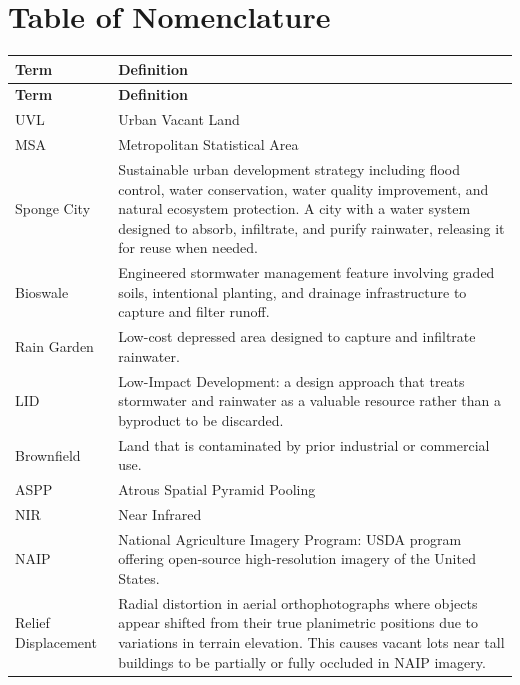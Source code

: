 \clearpage

\chapter*{Table of Nomenclature}

\begin{longtable}{@{} p{3.5cm} p{10cm} @{}}
\toprule
\textbf{Term} & \textbf{Definition} \\
\midrule
\endfirsthead
\toprule
\textbf{Term} & \textbf{Definition} \\
\midrule
\endhead
\bottomrule
\endfoot

UVL & Urban Vacant Land \\
MSA & Metropolitan Statistical Area \\
Sponge City & Sustainable urban development strategy including flood control, water conservation, water quality improvement, and natural ecosystem protection. A city with a water system designed to absorb, infiltrate, and purify rainwater, releasing it for reuse when needed. \\
Bioswale & Engineered stormwater management feature involving graded soils, intentional planting, and drainage infrastructure to capture and filter runoff. \\
Rain Garden & Low-cost depressed area designed to capture and infiltrate rainwater. \\
LID & Low-Impact Development: a design approach that treats stormwater and rainwater as a valuable resource rather than a byproduct to be discarded. \\
Brownfield & Land that is contaminated by prior industrial or commercial use. \\
ASPP & Atrous Spatial Pyramid Pooling \\
NIR & Near Infrared \\
NAIP & National Agriculture Imagery Program: USDA program offering open-source high-resolution imagery of the United States. \\
Relief Displacement & Radial distortion in aerial orthophotographs where objects appear shifted from their true planimetric positions due to variations in terrain elevation. This causes vacant lots near tall buildings to be partially or fully occluded in NAIP imagery. \\
\end{longtable}

